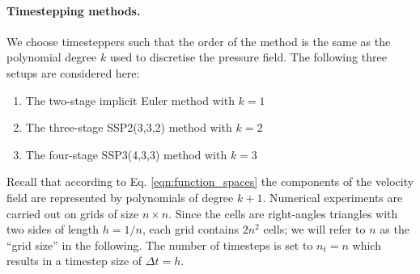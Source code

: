 \documentclass[11pt]{article}
\begin{document}
\paragraph{Timestepping methods.}
We choose timesteppers such that the order of the method is the same as the polynomial degree $k$ used to discretise the pressure field. The following three setups are considered here:
\begin{enumerate}
    \item The two-stage implicit Euler method with $k=1$
    \item The three-stage SSP2(3,3,2) method with $k=2$
    \item The four-stage SSP3(4,3,3) method with $k=3$
\end{enumerate}
Recall that according to Eq. \eqref{eqn:function_spaces} the components of the velocity field are represented by polynomials of degree $k+1$. Numerical experiments are carried out on grids of size $n\times n$. Since the cells are right-angles triangles with two sides of length $h=1/n$, each grid contains $2n^2$ cells; we will refer to $n$ as the ``grid size'' in the following. The number of timesteps is set to $n_t=n$ which results in a timestep size of $\Delta t=h$.
\end{document}
